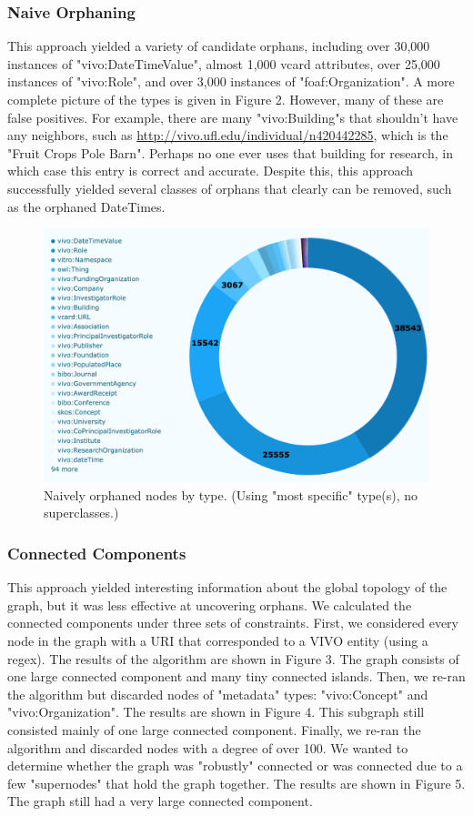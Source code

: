 \documentclass[11pt]{article}
\begin{document}
\subsubsection*{Naive Orphaning}
This approach yielded a variety of candidate orphans, including over 30,000 instances of "vivo:DateTimeValue", almost 1,000 vcard attributes, over 25,000 instances of "vivo:Role", and over 3,000 instances of "foaf:Organization". A more complete picture of the types is given in Figure 2. However, many of these are false positives. For example, there are many "vivo:Building"s that shouldn't have any neighbors, such as \url{http://vivo.ufl.edu/individual/n420442285}, which is the "Fruit Crops Pole Barn". Perhaps no one ever uses that building for research, in which case this entry is correct and accurate. Despite this, this approach successfully yielded several classes of orphans that clearly can be removed, such as the orphaned DateTimes.

\begin{figure}[h!]
\centering
\includegraphics[width=\textwidth]{orphan-types.png}
\caption{Naively orphaned nodes by type. (Using "most specific" type(s), no superclasses.)}
\label{fig:output}
\end{figure}

\subsubsection*{Connected Components}
This approach yielded interesting information about the global topology of the graph, but it was less effective at uncovering orphans. We calculated the connected components under three sets of constraints. First, we considered every node in the graph with a URI that corresponded to a VIVO entity (using a regex). The results of the algorithm are shown in Figure 3. The graph consists of one large connected component and many tiny connected islands. Then, we re-ran the algorithm but discarded nodes of "metadata" types: "vivo:Concept" and "vivo:Organization". The results are shown in Figure 4. This subgraph still consisted mainly of one large connected component. Finally, we re-ran the algorithm and discarded nodes with a degree of over 100. We wanted to determine whether the graph was "robustly" connected or was connected due to a few "supernodes" that hold the graph together. The results are shown in Figure 5. The graph still had a very large connected component.
\end{document}
